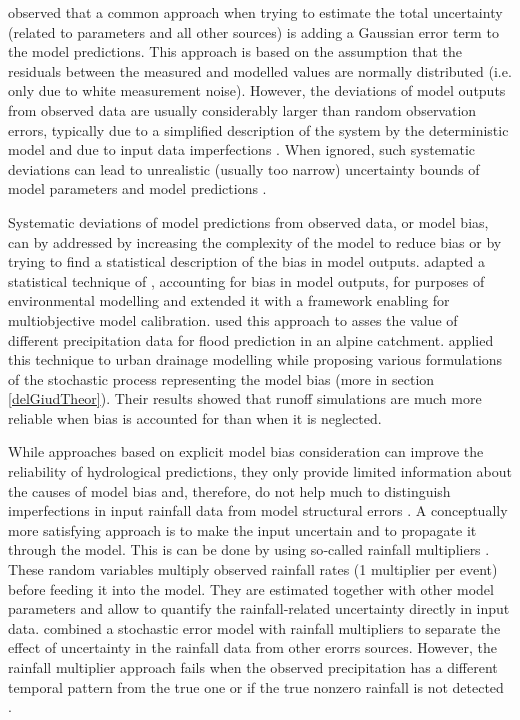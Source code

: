 \documentclass{ctuthesis}\usepackage[]{graphicx}\usepackage[]{color}
\begin{document}
\cite{dotto2012comparison} observed that a common approach when trying to estimate the total uncertainty (related to parameters and all other sources) is adding a Gaussian error term to the model predictions. This approach is based on the assumption that the residuals between the measured and modelled values are normally distributed (i.e. only due to white measurement noise). However, the deviations of model outputs from observed data are usually considerably larger than random observation errors, typically due to a simplified description of the system by the deterministic model and due to input data imperfections \citep{reichert2012linking}. When ignored, such systematic deviations can lead to unrealistic (usually too narrow) uncertainty bounds of model parameters and model predictions \citep{reichert2012linking}.

Systematic deviations of model predictions from observed data, or model bias, can by addressed by increasing the complexity of the model to reduce bias or by trying to find a statistical description of the bias in model outputs. \cite{reichert2012linking} adapted a statistical technique of \cite{kennedy2001bayesian}, accounting for bias in model outputs, for purposes of environmental modelling and extended it with a framework enabling for multiobjective model calibration. \cite{sikorskaValueDifferentPrecipitation2018} used this approach to asses the value of different precipitation data for flood prediction in an alpine catchment. \cite{giudice2013improving} applied this technique to urban drainage modelling while proposing various formulations of the stochastic process representing the model bias (more in section \ref{delGiudTheor}). Their results showed that runoff simulations are much more reliable when bias is accounted for than when it is neglected. 

While approaches based on explicit model bias consideration can improve the reliability of hydrological predictions, they only provide limited information about the causes of model bias and, therefore, do not help much to distinguish imperfections in input rainfall data from model structural errors \citep{giudice2013improving}. A conceptually more satisfying approach is to make the input uncertain and to propagate it through the model. This is can be done by using so‐called rainfall multipliers \citep{kavetskiBayesianAnalysisInput2006, vrugtTreatmentInputUncertainty2008}. These random variables multiply observed rainfall rates (1 multiplier per event) before feeding it into the model. They are estimated together
with other model parameters and allow to quantify the rainfall‐related uncertainty directly in input data. \cite{sikorskaBayesianUncertaintyAssessment2012} combined a stochastic error model with rainfall multipliers to separate the effect of uncertainty in the rainfall data from other erorrs sources. However, the rainfall multiplier approach fails when the observed precipitation has a different temporal pattern from the true one or if the true nonzero rainfall is not detected \citep{delgiudiceDescribingCatchmentaveragedPrecipitation2016}. 
\end{document}
